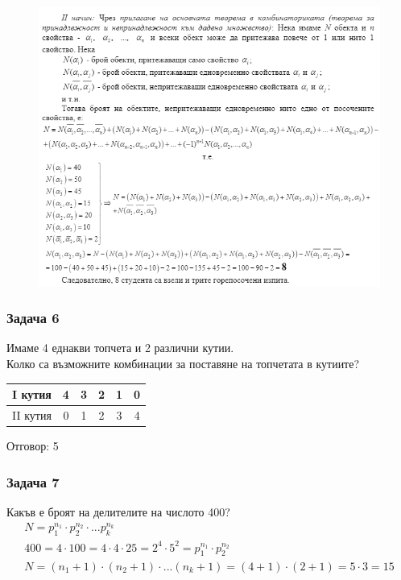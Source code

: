 \documentclass[fleqn, 12pt]{article}
\theoremstyle{definition}
\begin{document}
\begin{figure}[htp!]
\includegraphics{Pics/Discrete math/ex9/ex9-task5-2.png}
\end{figure}

\subsubsection*{Задача 6}
Имаме 4 еднакви топчета и 2 различни кутии. \\
Колко са възможните комбинации за поставяне на топчетата в кутиите?
\begin{center}
\begin{tabular}{|c|c|c|c|c|c|} 
\hline
I кутия & 4 & 3 & 2 & 1 & 0 \\
\hline
II кутия & 0 & 1 & 2 & 3 & 4 \\
\hline
\end{tabular}
\end{center}
Отговор: 5

\subsubsection*{Задача 7}
Какъв е броят на делителите на числото 400?
\begin{gather*}
N = p_1 ^{n_1} \cdot  p_2 ^{n_2} \cdot ...  p_k ^{n_k}\\
400 = 4 \cdot 100 = 4 \cdot 4 \cdot 25 = 2^4 \cdot 5^2 = p_1 ^{n_1} \cdot  p_2 ^{n_2}\\
N = (n_1 + 1) \cdot (n_2 + 1) \cdot ...  (n_k + 1) =  (4 + 1) \cdot (2 + 1) = 5 \cdot 3 = 15 
\end{gather*}
\end{document}
